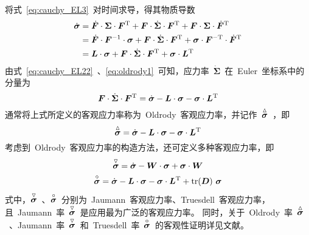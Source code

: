 将式~\eqref{eq:cauchy_EL3}~对时间求导，得其物质导数
\begin{equation}\label{eq:oldrody1}
\begin{split}
	\dot{\bm{\sigma}} & = \dot{\bm{F}} \cdot \bm{\Sigma} \cdot \bm{F}^{\mathrm{T}} + \bm{F} \cdot \dot{\bm{\Sigma}} \cdot \bm{F}^{\mathrm{T}} +
						  \bm{F} \cdot \bm{\Sigma} \cdot \dot{\bm{F}}^{\mathrm{T}} \\
					  & = \dot{\bm{F}} \cdot \bm{F}^{-1} \cdot \bm{\sigma} + \bm{F} \cdot \dot{\bm{\Sigma}} \cdot \bm{F}^{\mathrm{T}} +
						  \bm{\sigma} \cdot \bm{F}^{-\mathrm{T}} \cdot \dot{\bm{F}}^{\mathrm{T}} \\
					  & = \bm{L} \cdot \bm{\sigma} + \bm{F} \cdot \dot{\bm{\Sigma}} \cdot \bm{F}^{\mathrm{T}} + \bm{\sigma} \cdot \bm{L}^{\mathrm{T}}
\end{split}
\end{equation}
由式~\eqref{eq:cauchy_EL22}~、\eqref{eq:oldrody1}~可知，应力率~$\dot{\bm{\Sigma}}$~在~Euler~坐标系中的分量为
\begin{equation}
	\bm{F} \cdot \dot{\bm{\Sigma}} \cdot \bm{F}^{\mathrm{T}} = \dot{\bm{\sigma}} - \bm{L} \cdot \bm{\sigma} - \bm{\sigma} \cdot \bm{L}^{\mathrm{T}}
\end{equation}
通常将上式所定义的客观应力率称为~Oldrody~客观应力率，并记作~$\overset{\vartriangle}{\bm{\sigma}}$~，即
\begin{equation}\label{eq:oldrody2}
	\overset{\vartriangle}{\bm{\sigma}} = \dot{\bm{\sigma}} - \bm{L} \cdot \bm{\sigma} - \bm{\sigma} \cdot \bm{L}^{\mathrm{T}}
\end{equation}
考虑到~Oldrody~客观应力率的构造方法，还可定义多种客观应力率，即
\begin{gather}
	  \overset{\triangledown}{\bm{\sigma}} = \dot{\bm{\sigma}} - \bm{W} \cdot \bm{\sigma} + \bm{\sigma} \cdot \bm{W} \label{eq:jaumann} \\
	\overset{\circ}{\bm{\sigma}} = \dot{\bm{\sigma}} - \bm{L} \cdot \bm{\sigma} - \bm{\sigma} \cdot \bm{L}^{\mathrm{T}} + \operatorname{tr}(\bm{D})~\bm{\sigma} \label{eq:truesdell}
\end{gather}
式中，$\overset{\triangledown}{\bm{\sigma}}$~、$\overset{\circ}{\bm{\sigma}}$~分别为~Jaumann~客观应力率、Truesdell~客观应力率，且~Jaumann~率~$\overset{\triangledown}{\bm{\sigma}}$~是应用最为广泛的客观应力率。
同时，关于~Oldrody~率~$\overset{\vartriangle}{\bm{\sigma}}$~、Jaumann~率~$\overset{\triangledown}{\bm{\sigma}}$~和~Truesdell~率~$\overset{\circ}{\bm{\sigma}}$~的客观性证明详见文献\cite{gutibengou}。

